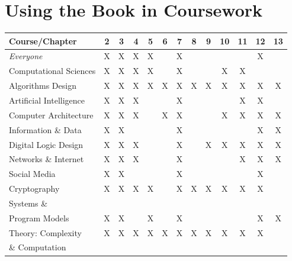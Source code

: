 \documentclass{article}
\begin{document}
\section*{Using the Book in Coursework}

\bigskip

\begin{tabular}{|l||c|c|c|c|c|c|c|c|c|c|c|c|}
\hline
{\bf Course}/{\bf Chapter}
   & 2 & 3 & 4 & 5 & 6 & 7 & 8 & 9 & 10 & 11 & 12 & 13 \\
\hline
\hline
{\em Everyone} 
   & X & X & X & X &  & X &  &  &  &  & X &  \\
\hline
Computational Sciences
   & X & X & X & X &  & X &  &  & X & X &  &  \\
\hline
Algorithms Design
   & X & X & X & X & X & X & X & X & X & X & X & X \\
\hline
Artificial Intelligence
   & X & X & X &  &  & X &  &  &  & X & X &  \\
\hline
Computer Architecture 
   & X & X &  X&  & X & X &  &  & X & X & X & X \\
\hline
Information \& Data 
   & X & X &  &  &  & X &  &  &  &  & X & X \\
\hline
Digital Logic Design 
   & X & X & X &  &  & X &  & X & X & X & X & X \\
\hline
Networks \& Internet
   & X & X & X &  &  & X &  &  &  & X & X & X \\
\hline
Social Media 
   & X & X &  &  &  & X &  &  &  &  & X &  \\
   \hline
Cryptography 
   & X & X & X & X &  & X & X & X & X & X & X &  \\
\hline
Systems \&    &  &  &  &  &  &  &  &  &  &  &  & \\
Program Models 
   & X & X &  & X &  & X &  &  &  &  & X & X \\
\hline
Theory: Complexity 
   & X & X & X & X & X & X & X & X & X & X & X &  \\
\& Computation    &  &  &  &  &  &  &  &  &  &  &  & \\
\hline
\end{tabular}
\bigskip
\end{document}
